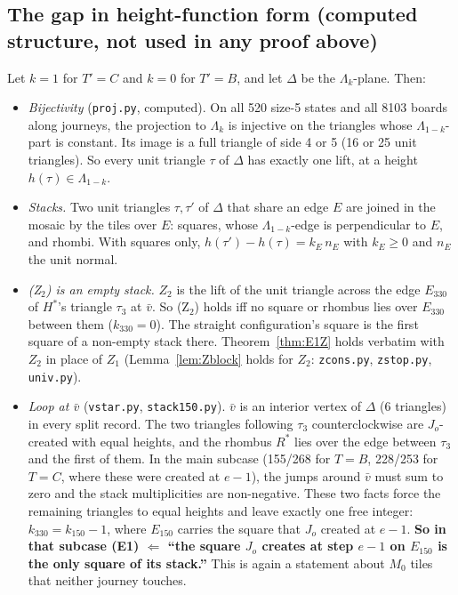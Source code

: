 \documentclass[11pt]{article}
\theoremstyle{definition}\newtheorem{definition}[theorem]{Definition}\newtheorem{remark}[theorem]{Remark}
\begin{document}
\subsection*{The gap in height-function form (computed structure, not used in any proof above)}
Let $k=1$ for $T'=C$ and $k=0$ for $T'=B$, and let $\Delta$ be the $\Lambda_k$-plane. Then:
\begin{itemize}
\item \emph{Bijectivity} (\texttt{proj.py}, computed). On all 520 size-5 states and all 8103 boards along journeys, the projection to $\Lambda_k$ is injective on the triangles whose $\Lambda_{1-k}$-part is constant. Its image is a full triangle of side 4 or 5 (16 or 25 unit triangles). So every unit triangle $\tau$ of $\Delta$ has exactly one lift, at a height $h(\tau)\in\Lambda_{1-k}$.
\item \emph{Stacks.} Two unit triangles $\tau,\tau'$ of $\Delta$ that share an edge $E$ are joined in the mosaic by the tiles over $E$: squares, whose $\Lambda_{1-k}$-edge is perpendicular to $E$, and rhombi. With squares only, $h(\tau')-h(\tau)=k_E\,n_E$ with $k_E\ge0$ and $n_E$ the unit normal.
\item \emph{(Z$_2$) is an empty stack.} $Z_2$ is the lift of the unit triangle across the edge $E_{330}$ of $H^\ast$'s triangle $\tau_3$ at $\bar v$. So (Z$_2$) holds iff no square or rhombus lies over $E_{330}$ between them ($k_{330}=0$). The straight configuration's square is the first square of a non-empty stack there. Theorem~\ref{thm:E1Z} holds verbatim with $Z_2$ in place of $Z_1$ (Lemma~\ref{lem:Zblock} holds for $Z_2$: \texttt{zcons.py}, \texttt{zstop.py}, \texttt{univ.py}).
\item \emph{Loop at $\bar v$} (\texttt{vstar.py}, \texttt{stack150.py}). $\bar v$ is an interior vertex of $\Delta$ (6 triangles) in every split record. The two triangles following $\tau_3$ counterclockwise are $J_o$-created with equal heights, and the rhombus $R^\ast$ lies over the edge between $\tau_3$ and the first of them. In the main subcase (155/268 for $T=B$, 228/253 for $T=C$, where these were created at $e-1$), the jumps around $\bar v$ must sum to zero and the stack multiplicities are non-negative. These two facts force the remaining triangles to equal heights and leave exactly one free integer: $k_{330}=k_{150}-1$, where $E_{150}$ carries the square that $J_o$ created at $e-1$. \textbf{So in that subcase (E1) $\Leftarrow$ ``the square $J_o$ creates at step $e-1$ on $E_{150}$ is the only square of its stack.''} This is again a statement about $M_0$ tiles that neither journey touches.
\end{itemize}
\end{document}
